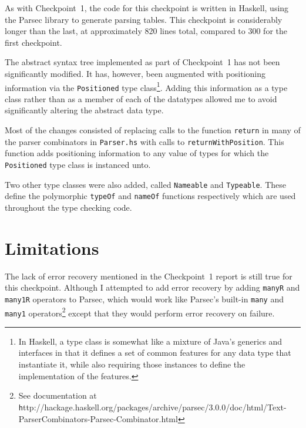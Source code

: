 \documentclass[12pt]{amsart}
\begin{document}
As with Checkpoint~1, the code for this checkpoint is written in
Haskell, using the Parsec library to generate parsing tables. This
checkpoint is considerably longer than the last, at approximately 820
lines total, compared to 300 for the first checkpoint.

The abstract syntax tree implemented as part of Checkpoint~1 has not
been significantly modified. It has, however, been augmented with
positioning information via the \verb|Positioned| type
class\footnote{In Haskell, a type class is somewhat like a mixture of
  Java's generics and interfaces in that it defines a set of common
  features for any data type that instantiate it, while also requiring
  those instances to define the implementation of the
  features.}. Adding this information as a type class rather than as a
member of each of the datatypes allowed me to avoid significantly
altering the abstract data type. 

Most of the changes consisted of replacing calls to the function
\verb|return| in many of the parser combinators in \verb|Parser.hs|
with calls to \verb|returnWithPosition|. This function adds
positioning information to any value of types for which the
\verb|Positioned| type class is instanced unto.

Two other type classes were also added, called \verb|Nameable| and
\verb|Typeable|. These define the polymorphic \verb|typeOf| and
\verb|nameOf| functions respectively which are used throughout the type
checking code.

\section{Limitations}
The lack of error recovery mentioned in the Checkpoint~1 report is
still true for this checkpoint. Although I attempted to add error
recovery by adding \verb|manyR| and \verb|many1R| operators to Parsec,
which would work like Parsec's built-in \verb|many| and \verb|many1|
operators\footnote{See documentation at {\texttt
    http://hackage.haskell.org/packages/archive/parsec/3.0.0/doc/html/Text-ParserCombinators-Parsec-Combinator.html}}
except that they would perform error recovery on failure.
\end{document}
